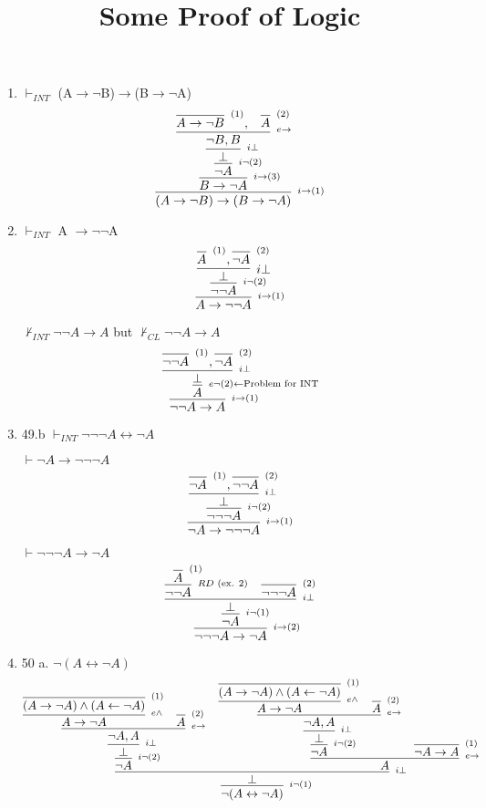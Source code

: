 \documentclass[]{article}
\title{Some Proof of Logic}
\author{}
\date{}
\def\imp{\to} %
\def\ifof{\leftrightarrow} %
\def\n{\neg}%
\begin{document}
\maketitle
\begin{enumerate}
	\item $\vdash_{INT}$ (A$\imp\neg$B)$\imp$(B$\imp\neg$A)
	$$ 
	\infer[^{i\imp (1)}]{(A\imp\neg B)\imp(B\imp\neg A)}{
	  \infer[^{i \imp (3)}]{B\imp\neg A}
	  {
	  	\infer[^{i\neg (2)}]{\neg A}
	  	{
	  	  \infer[^{i \bot}]{\bot}
	  	  {
	  	  	\infer[^{e\imp}]{\neg B, B}
	  	  	{
	  	  		\infer[^{(1)}]{A\imp\neg B}{}, & \infer[^{(2)}]{A}{}
	  	  	}
	  	  }
	  	}
	  }
	} 
	$$
	\item $\vdash_{INT}$ A $\imp\neg\neg$A 
	$$
	\infer[^{i\imp(1)}]{A\imp\neg\neg A}{
	  \infer[^{i\neg(2)}]{\neg\neg A}{
	  	\infer[i \bot]{\bot}{\infer[^{(1)}]{A}{},\infer[^{(2)}]{\neg A}{}}
	  }
	}
	$$

	$\nvdash_{INT} \neg\neg A \imp A$ but $\nvdash_{CL} \neg\neg A \imp A$
	$$
	\infer[^{i\imp(1)}]{\neg\neg A \imp A}{
	  \infer[^{e\neg(2) \gets \textrm{Problem for INT}}]{A}{
	    \infer[^{i\bot}]{\bot}{\infer[^{(1)}]{\neg\neg A}{},\infer[^{(2)}]{\neg A}{}}
  	  }
	}
	$$
	
	\item 49.b $\vdash_{INT} \neg \neg \neg A \ifof \neg A$
	
	$\vdash \neg A \imp \neg \neg \neg A$
	$$
	\infer[^{i\imp(1)}]{\neg A \imp \neg \n\n A}{
	  \infer[^{i\n(2)}]{\n\n\n A}{
	    \infer[^{i\bot}]{\bot}{
	      \infer[^{(1)}]{\n A}{}, \infer[^{(2)}]{\n\n A}{}	
	    }
	  }
	}
	$$
	
	$\vdash \n\n\n A \imp \neg A$
	$$
	\infer[^{i\imp (2)}]{\n\n\n A \imp \neg A}{
	  \infer[^{i\n(1)}]{\n A}{
	    \infer[^{i\bot}]{\bot}{
	      \infer[^{RD \textrm{ (ex. 2)}}]{\n\n A}{\infer[^{(1)}]{A}{}} & \infer[^{(2)}]{\n\n\n A}{} 
	    }	
	  }	
	}
	$$
	\pagebreak
	\item 50 a. $\n(A\ifof \n A)$
	$$
	\infer[^{i\n (1)}]{\n(A\ifof \n A)}{
	  \infer[^{i \bot}]{\bot}{
	    \infer[^{i\n (2)}]{\n A}{
	    	\infer[^{i \bot}]{\bot}{
	    	  \infer[^{e \imp}]{\n A, A}{
	    	  	\infer[^{e \land}]{A \imp \n A}
	    	  		{\infer[^{(1)}]{(A \imp \n A) \land (A \gets \n A)}{}}{}
	    	  		&
	    	  		\infer[^{(2)}]{A}{}
    		  }
	    	}
    	}
	    &
	    \infer[^{e \imp}]{A}{
	    \infer[^{i\n (2)}]{\n A}{
	    	\infer[^{i \bot}]{\bot}{
	    		\infer[^{e \imp}]{\n A, A}{
	    			\infer[^{e \land}]{A \imp \n A}
	    			{\infer[^{(1)}]{(A \imp \n A) \land (A \gets \n A)}{}}{}
	    			&
	    			\infer[^{(2)}]{A}{}
	    		}
	    	}
	    }
	    &
	    \infer[^{(1)}]{\n A \imp A}{}
        }	
	  }
	}
	$$
	

\end{enumerate}
\end{document}
